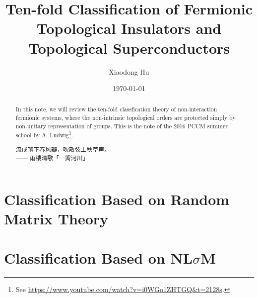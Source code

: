 \documentclass[10pt,nofootinbib,letterpaper]{revtex4}
\begin{document}
\title{Ten-fold Classification of Fermionic Topological Insulators and Topological Superconductors}
\author{Xiaodong Hu}

\date{\today}

\begin{abstract}
	In this note, we will review the ten-fold classfication theory of non-interaction fermionic systems, where the non-intrinsic topological orders are protected simply by non-unitary representation of groups. This is the note of the 2016 PCCM summer school by A. Ludwig\footnote{See \url{https://www.youtube.com/watch?v=i0WGo1ZHTGQ&t=2128s}.}.\par
		\hfill\par
		{\centering\kaishu 流成笔下春风瓣，吹散弦上秋草声。\\[0.5em]}
	\hfill------ 雨楼清歌「一瓣河川」
\end{abstract}

\maketitle
\tableofcontents

\section{Classification Based on Random Matrix Theory}
\section{Classification Based on NL$\sigma$M}
\end{document}
